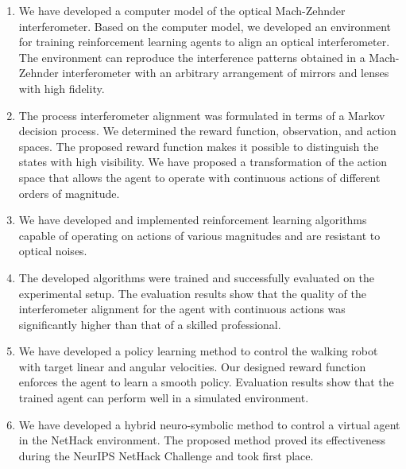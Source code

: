 \begin{enumerate}
  \item We have developed a computer model of the optical Mach-Zehnder interferometer. Based on the computer model, we developed an environment for training reinforcement learning agents to align an optical interferometer. The environment can reproduce the interference patterns obtained in a Mach-Zehnder interferometer with an arbitrary arrangement of mirrors and lenses with high fidelity.
  \item The process interferometer alignment was formulated in terms of a Markov decision process. We determined the reward function, observation, and action spaces. The proposed reward function makes it possible to distinguish the states with high visibility. We have proposed a transformation of the action space that allows the agent to operate with continuous actions of different orders of magnitude.  
  \item We have developed and implemented reinforcement learning algorithms capable of operating on actions of various magnitudes and are resistant to optical noises.
  \item The developed algorithms were trained and successfully evaluated on the experimental setup. The evaluation results show that the quality of the interferometer alignment for the agent with continuous actions was significantly higher than that of a skilled professional.
  \item We have developed a policy learning method to control the walking robot with target linear and angular velocities. Our designed reward function enforces the agent to learn a smooth policy. Evaluation results show that the trained agent can perform well in a simulated environment.
  \item We have developed a hybrid neuro-symbolic method to control a virtual agent in the NetHack environment. The proposed method proved its effectiveness during the NeurIPS NetHack Challenge and took first place.
\end{enumerate}

\newpage



